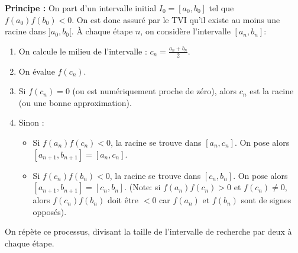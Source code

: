 \textbf{Principe :}
On part d'un intervalle initial $I_0 = [a_0, b_0]$ tel que $f(a_0)f(b_0) < 0$. On est donc assuré par le TVI qu'il existe au moins une racine dans $]a_0, b_0[$.
À chaque étape $n$, on considère l'intervalle $[a_n, b_n]$:
\begin{enumerate}
    \item On calcule le milieu de l'intervalle : $c_n = \frac{a_n+b_n}{2}$.
    \item On évalue $f(c_n)$.
    \item Si $f(c_n)=0$ (ou est numériquement proche de zéro), alors $c_n$ est la racine (ou une bonne approximation).
    \item Sinon :
    \begin{itemize}
        \item Si $f(a_n)f(c_n) < 0$, la racine se trouve dans $[a_n, c_n]$. On pose alors $[a_{n+1}, b_{n+1}] = [a_n, c_n]$.
        \item Si $f(c_n)f(b_n) < 0$, la racine se trouve dans $[c_n, b_n]$. On pose alors $[a_{n+1}, b_{n+1}] = [c_n, b_n]$. (Note: si $f(a_n)f(c_n) > 0$ et $f(c_n) \neq 0$, alors $f(c_n)f(b_n)$ doit être $<0$ car $f(a_n)$ et $f(b_n)$ sont de signes opposés).
    \end{itemize}
\end{enumerate}
On répète ce processus, divisant la taille de l'intervalle de recherche par deux à chaque étape.

